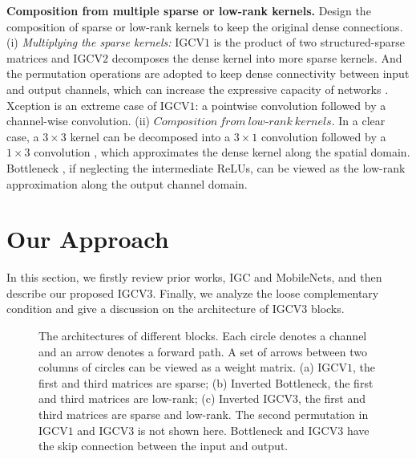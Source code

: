 \documentclass{bmvc2k}
\begin{document}
	\noindent\textbf{Composition from multiple sparse or low-rank kernels.} Design the composition of sparse or low-rank kernels to keep the original dense connections.
	(i) \emph{Multiplying the sparse kernels:} IGCV$1$ \cite{zhang2017interleaved} is the product of two structured-sparse matrices and IGCV$2$ \cite{ISSC18} decomposes the dense kernel into more sparse kernels. And the permutation operations \cite{zhang2017interleaved} are adopted to keep dense connectivity between input and output channels, which can increase the expressive capacity of networks \cite{sharir2017expressive}.
	Xception \cite{Chollet16a} is an extreme case of IGCV$1$: a pointwise convolution followed by a channel-wise convolution.
	(ii) $Composition\ from\ low$-$rank\ kernels.$ In a clear case, a $3\times3$ kernel can be decomposed into a $3\times1$ convolution followed by a $1\times3$ convolution \cite{IoannouRSCC15, JaderbergVZ14, MamaletG12}, which approximates the dense kernel along the spatial domain. Bottleneck \cite{he2016deep,iandola2016squeezenet,sandler2018inverted}, if neglecting the intermediate ReLUs, can be viewed as the low-rank approximation along the output channel domain.

	\section{Our Approach}
	In this section, we firstly review prior works, IGC and MobileNets, and then describe our proposed IGCV$3$. Finally, we analyze the loose complementary condition and give a discussion on the architecture of IGCV$3$ blocks.

	\begin{figure}[htb!]
		\centering
		\caption{The architectures of different blocks. Each circle denotes a channel and an arrow denotes a forward path. A set of arrows between two columns of circles can be viewed as a weight matrix. (a) IGCV$1$, the first and third matrices are sparse; (b) Inverted Bottleneck, the first and third matrices are low-rank; (c) Inverted IGCV$3$, the first and third matrices are sparse and low-rank. The second permutation in IGCV$1$ and IGCV$3$ is not shown here. Bottleneck and IGCV3 have the skip connection between the input and output.}
		\label{fig:diff_arch}
	\end{figure}
\end{document}
